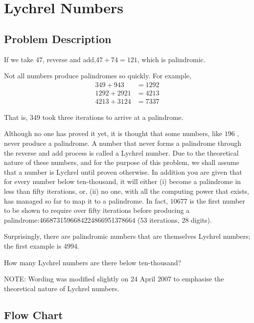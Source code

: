 \section{Lychrel Numbers}

\subsection{Problem Description}
If we take \( 47 \), reverse and add,\( 47 + 74 = 121 \), which is palindromic.

Not all numbers produce palindromes so quickly. For example,
\begin{align*}
	349 + 943   & = 1292 \\
	1292 + 2921 & = 4213 \\
	4213 + 3124 & = 7337
\end{align*}

That is, \( 349 \) took three iterations to arrive at a palindrome.

Although no one has proved it yet, it is thought that some numbers, like \( 196 \)
, never produce a palindrome. A number that never forms a palindrome through the reverse and add process is called a
Lychrel number. Due to the theoretical nature of these numbers, and for the purpose of this problem, we shall assume
that a number is Lychrel until proven otherwise. In addition you are given that for every number below ten-thousand, it
will either (i) become a palindrome in less than fifty iterations, or, (ii) no one, with all the computing power that
exists, has managed so far to map it to a palindrome. In fact, \( 10677 \)
is the first number to be shown to require over fifty iterations before producing a palindrome:4668731596684224866951378664
(\( 53 \) iterations, \( 28 \) digits).

Surprisingly, there are palindromic numbers that are themselves Lychrel numbers; the first example is \( 4994 \).

How many Lychrel numbers are there below ten-thousand?

NOTE: Wording was modified slightly on 24 April 2007 to emphasise the theoretical nature of Lychrel numbers.

\subsection{Flow Chart}

